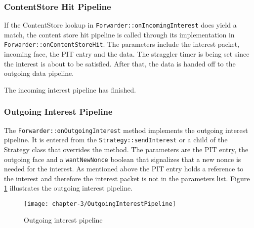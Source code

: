 \subsubsection{ContentStore Hit Pipeline}

If the ContentStore lookup in \texttt{Forwarder::onIncomingInterest} does yield a match, the content store hit pipeline is called through its implementation in \texttt{Forwarder::onContentStoreHit}. The parameters include the interest packet, incoming face, the PIT entry and the data. The straggler timer is being set since the interest is about to be satisfied. After that, the data is handed off to the outgoing data pipeline.

The incoming interest pipeline has finished.

\subsubsection{Outgoing Interest Pipeline}

The \texttt{Forwarder::onOutgoingInterest} method implements the outgoing interest pipeline. It is entered from the \texttt{Strategy::sendInterest} or a child of the Strategy class that overrides the method. The parameters are the PIT entry, the outgoing face and a \texttt{wantNewNonce} boolean that signalizes that a new nonce is needed for the interest. As mentioned above the PIT entry holds a reference to the interest and therefore the interest packet is not in the parameters list. Figure \ref{fig:OutgoingInterestPipeline} illustrates the outgoing interest pipeline.

\vspace{5mm} %

\begin{figure}[H]
  \centering
  \texttt{[image: chapter-3/OutgoingInterestPipeline]}
  \caption{Outgoing interest pipeline \cite{Afanasyev16}}
  \label{fig:OutgoingInterestPipeline}
\end{figure}

\vspace{5mm} %

